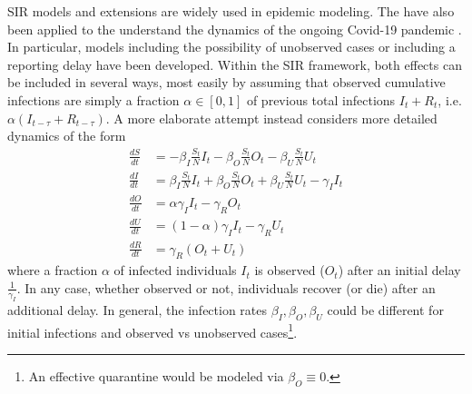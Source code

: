 \documentclass[fullpage,a4paper]{article}
\begin{document}
SIR models and extensions are widely used in epidemic modeling. The
have also been applied to the understand the dynamics of the ongoing
Covid-19 pandemic
\cite{arxiv:2002.07572,arxiv:2004.01105,10.1126/science.abb3221,https://www.medrxiv.org/content/10.1101/2020.02.27.20028639v2}.
In particular, models including the possibility of unobserved cases or
including a reporting delay have been developed. Within the SIR
framework, both effects can be included in several ways, most easily
by assuming that observed cumulative infections are simply a fraction
$\alpha \in [0, 1]$ of previous total infections $I_t + R_t$,
i.e. $\alpha (I_{t - \tau} + R_{t - \tau})$. A more elaborate attempt
instead considers more detailed dynamics of the form
\begin{align*}
  \frac{dS}{dt} &= - \beta_I \frac{S_t}{N} I_t - \beta_O \frac{S_t}{N} O_t - \beta_U \frac{S_t}{N} U_t \\
  \frac{dI}{dt} &= \beta_I \frac{S_t}{N} I_t + \beta_O \frac{S_t}{N} O_t + \beta_U \frac{S_t}{N} U_t - \gamma_I I_t \\
  \frac{dO}{dt} &= \alpha \gamma_I I_t - \gamma_R O_t \\
  \frac{dU}{dt} &= (1 - \alpha) \gamma_I I_t - \gamma_R U_t \\
  \frac{dR}{dt} &= \gamma_R (O_t + U_t)
\end{align*}
where a fraction $\alpha$ of infected individuals $I_t$ is observed
($O_t$) after an initial delay $\frac{1}{\gamma_I}$. In any case,
whether observed or not, individuals recover (or die) after an
additional delay. In general, the infection rates $\beta_I, \beta_O,
\beta_U$ could be different for initial infections and observed vs
unobserved cases\footnote{An effective quarantine would be modeled via
  $\beta_O \equiv 0$.}.
\end{document}

